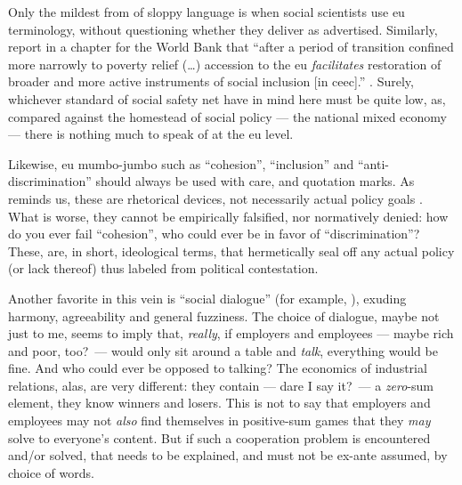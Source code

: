 Only the mildest from of sloppy language is when social scientists use \gls{eu} terminology, without questioning whether they deliver as advertised.
Similarly, \citeauthor{Sipos2005} report in a chapter for the World Bank that ``after a period of transition confined more narrowly to poverty relief (\ldots) accession to the \gls{eu} \emph{facilitates} restoration of broader and more active instruments of social inclusion [in \gls{ceec}].'' \citeyearpar[89, emphasis added]{Sipos2005}.
Surely, whichever standard \citeauthor{Sipos2005} of social safety net have in mind here must be quite low, as, compared against the homestead of social policy --- the national mixed economy --- there is nothing much to speak of at the \gls{eu} level.

Likewise, \gls{eu} mumbo-jumbo such as ``cohesion'', ``inclusion'' and ``anti-discrimination'' should always be used with care, and quotation marks.
As \citeauthor{Offe2003} reminds us, these are rhetorical devices, not necessarily actual policy goals \citeyearpar[461]{Offe2003}.
What is worse, they cannot be empirically falsified, nor normatively denied:
how do you ever fail ``cohesion'', who could ever be in favor of ``discrimination''?
These, are, in short, ideological terms, that hermetically seal off any actual policy (or lack thereof) thus labeled from political contestation.

Another favorite in this vein is ``social dialogue'' (for example, \citealt{Durr2009}), exuding harmony, agreeability and general fuzziness.
The choice of dialogue, maybe not just to me, seems to imply that, \emph{really}, if employers and employees --- maybe rich and poor, too?\ --- would only sit around a table and \emph{talk}, everything would be fine.
And who could ever be opposed to talking?
The economics of industrial relations, alas, are very different:
they contain --- dare I say it?\ --- a \emph{zero}-sum element, they know winners and losers.
This is not to say that employers and employees may not \emph{also} find themselves in positive-sum games that they \emph{may} solve to everyone's content.
But if such a cooperation problem is encountered and/or solved, that needs to be explained, and must not be ex-ante assumed, by choice of words.

